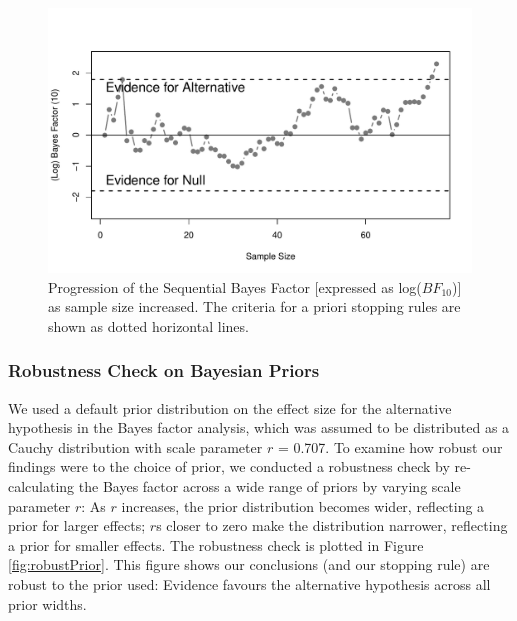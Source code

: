 \documentclass[a4paper, man, natbib]{apa6}
\begin{document}
\begin{figure}
\begin{center}
\includegraphics[width = \textwidth]{Images/bayesFactor.pdf}
\caption{Progression of the Sequential Bayes Factor [expressed as log($BF_{10}$)] as sample size increased. The criteria for a priori stopping rules are shown as dotted horizontal lines.}
\label{fig:bayesFactor}
\end{center}
\end{figure}


\subsubsection{Robustness Check on Bayesian Priors}
We used a default prior distribution on the effect size for the alternative hypothesis in the Bayes factor analysis, which was assumed to be distributed as a Cauchy distribution with scale parameter $r$ = 0.707. To examine how robust our findings were to the choice of prior, we conducted a robustness check by re-calculating the Bayes factor across a wide range of priors by varying scale parameter $r$: As $r$ increases, the prior distribution becomes wider, reflecting a prior for larger effects; $r$s closer to zero make the distribution narrower, reflecting a prior for smaller effects. The robustness check is plotted in Figure \ref{fig:robustPrior}. This figure shows our conclusions (and our stopping rule) are robust to the prior used: Evidence favours the alternative hypothesis across all prior widths.
\end{document}
